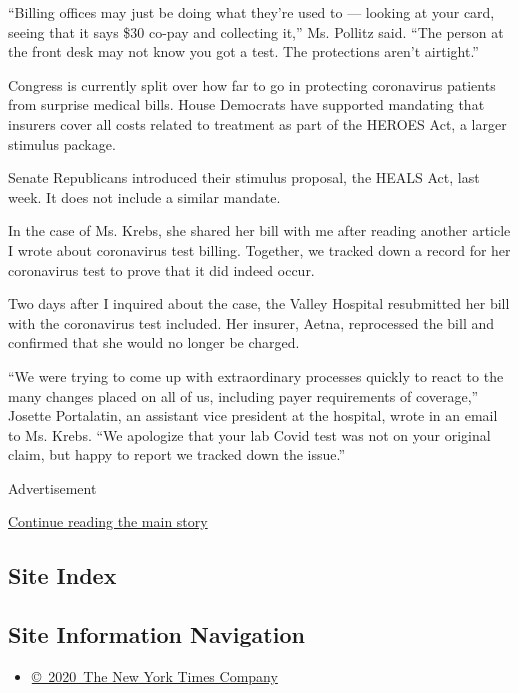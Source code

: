 ``Billing offices may just be doing what they're used to --- looking at
your card, seeing that it says \$30 co-pay and collecting it,'' Ms.
Pollitz said. ``The person at the front desk may not know you got a
test. The protections aren't airtight.''

Congress is currently split over how far to go in protecting coronavirus
patients from surprise medical bills. House Democrats have supported
mandating that insurers cover all costs related to treatment as part of
the HEROES Act, a larger stimulus package.

Senate Republicans introduced their stimulus proposal, the HEALS Act,
last week. It does not include a similar mandate.

In the case of Ms. Krebs, she shared her bill with me after reading
another article I wrote about coronavirus test billing. Together, we
tracked down a record for her coronavirus test to prove that it did
indeed occur.

Two days after I inquired about the case, the Valley Hospital
resubmitted her bill with the coronavirus test included. Her insurer,
Aetna, reprocessed the bill and confirmed that she would no longer be
charged.

``We were trying to come up with extraordinary processes quickly to
react to the many changes placed on all of us, including payer
requirements of coverage,'' Josette Portalatin, an assistant vice
president at the hospital, wrote in an email to Ms. Krebs. ``We
apologize that your lab Covid test was not on your original claim, but
happy to report we tracked down the issue.''

Advertisement

\protect\hyperlink{after-bottom}{Continue reading the main story}

\hypertarget{site-index}{%
\subsection{Site Index}\label{site-index}}

\hypertarget{site-information-navigation}{%
\subsection{Site Information
Navigation}\label{site-information-navigation}}

\begin{itemize}
\tightlist
\item
  \href{https://help.nytimes3xbfgragh.onion/hc/en-us/articles/115014792127-Copyright-notice}{©~2020~The
  New York Times Company}
\end{itemize}

